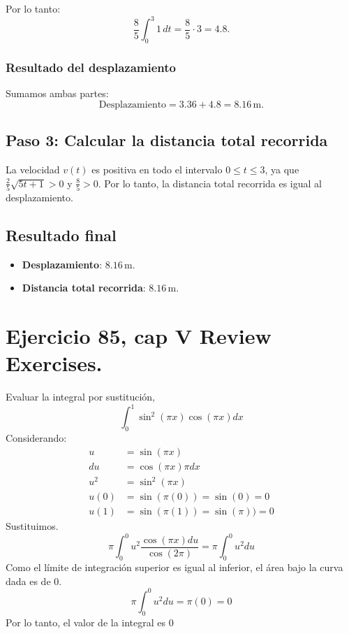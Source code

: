 \documentclass[11pt,letterpaper]{article}
\begin{document}
Por lo tanto:
\[
\frac{8}{5} \int_{0}^{3} 1 \, dt = \frac{8}{5} \cdot 3 = 4.8.
\]

\subsubsection*{Resultado del desplazamiento}
Sumamos ambas partes:
\[
\text{Desplazamiento} = 3.36 + 4.8 = 8.16 \, \text{m}.
\]

\subsection*{Paso 3: Calcular la distancia total recorrida}

La velocidad \(v(t)\) es positiva en todo el intervalo \(0 \leq t \leq 3\), ya que \(\frac{2}{5} \sqrt{5t + 1} > 0\) y \(\frac{8}{5} > 0\). Por lo tanto, la distancia total recorrida es igual al desplazamiento.

\subsection*{Resultado final}
\begin{itemize}
    \item \textbf{Desplazamiento}: \(8.16 \, \text{m}\).
    \item \textbf{Distancia total recorrida}: \(8.16 \, \text{m}\).
\end{itemize}

\section{Ejercicio 85, cap V Review Exercises.}
Evaluar la integral por sustitución,
\begin{equation*}
  \int_0^1\sin^2(\pi x)\cos(\pi x)dx
\end{equation*}
Considerando:
\begin{equation*}
  \begin{split}
    u &= \sin(\pi x)\\
    du &= \cos(\pi x)\pi dx\\
    u^2 &= \sin^2(\pi x)\\
    u(0)&=\sin(\pi (0))=\sin(0)=0\\
    u(1) &= \sin(\pi (1)) = \sin(\pi))=0
  \end{split}
\end{equation*}
Sustituimos.
\begin{equation*}
  \pi \int_0^0u^2 \frac{\cos(\pi x)du}{\cos(2\pi)} = \pi \int_0^0 u^2du
\end{equation*}
Como el límite de integración superior es igual al inferior, el área bajo la curva dada es de 0.
\begin{equation*}
  \pi \int_0^0 u^2du = \pi (0) = 0
\end{equation*}
Por lo tanto, el valor de la integral es 0
\end{document}
